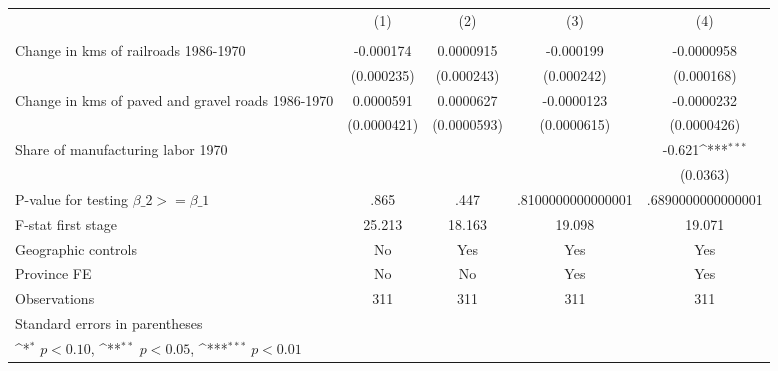 {
\def\sym#1{\ifmmode^{#1}\else\(^{#1}\)\fi}
\begin{tabular}{l*{4}{c}}
\hline\hline
                &\multicolumn{1}{c}{(1)}&\multicolumn{1}{c}{(2)}&\multicolumn{1}{c}{(3)}&\multicolumn{1}{c}{(4)}\\
                &\multicolumn{1}{c}{}&\multicolumn{1}{c}{}&\multicolumn{1}{c}{}&\multicolumn{1}{c}{}\\
\hline
Change in kms of railroads 1986-1970&-0.000174         &0.0000915         &-0.000199         &-0.0000958         \\
                &(0.000235)         &(0.000243)         &(0.000242)         &(0.000168)         \\
[1em]
Change in kms of paved and gravel roads 1986-1970&0.0000591         &0.0000627         &-0.0000123         &-0.0000232         \\
                &(0.0000421)         &(0.0000593)         &(0.0000615)         &(0.0000426)         \\
[1em]
Share of manufacturing labor 1970&                  &                  &                  &   -0.621\sym{***}\\
                &                  &                  &                  & (0.0363)         \\
\hline
P-value for testing $\beta\_{2} >= \beta\_{1}$&     .865         &     .447         &.8100000000000001         &.6890000000000001         \\
F-stat first stage&   25.213         &   18.163         &   19.098         &   19.071         \\
Geographic controls&       No         &      Yes         &      Yes         &      Yes         \\
Province FE     &       No         &       No         &      Yes         &      Yes         \\
Observations    &      311         &      311         &      311         &      311         \\
\hline\hline
\multicolumn{5}{l}{\footnotesize Standard errors in parentheses}\\
\multicolumn{5}{l}{\footnotesize \sym{*} \(p<0.10\), \sym{**} \(p<0.05\), \sym{***} \(p<0.01\)}\\
\end{tabular}
}

